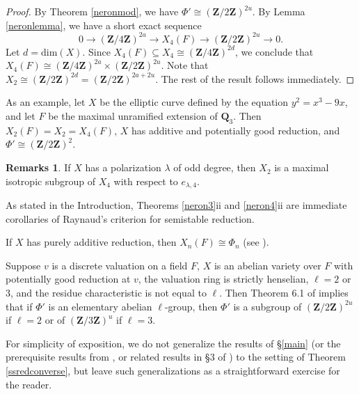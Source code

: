 \documentclass{amsart}
\def\Q{{\mathbf Q}}
\def\Z{{\mathbf Z}}
\def\dim{\mathrm{dim}}
\theoremstyle{definition}
\newtheorem{rems}[thm]{Remarks}
\begin{document}
\begin{proof}
By Theorem \ref{neronmod},
we have $\Phi' \cong (\Z/2\Z)^{2u}$. By Lemma \ref{neronlemma}, 
we have a short exact sequence 
$$0 \to  (\Z/4\Z)^{2a} \to X_4(F) \to (\Z/2\Z)^{2u} \to 0.$$
Let $d = \dim(X)$. 
Since $X_4(F) \subseteq X_4 \cong (\Z/4\Z)^{2d}$,
we conclude that $X_4(F) \cong (\Z/4\Z)^{2a} \times (\Z/2\Z)^{2u}$. 
Note that $X_2 \cong (\Z/2\Z)^{2d} = (\Z/2\Z)^{2a + 2u}$. 
The rest of the result follows immediately.
\end{proof}

As an example, let $X$ be the elliptic curve defined by
the equation $y^2 = x^3 - 9x$, and let $F$ be the maximal unramified
extension of $\Q_3$.
Then $X_2(F) = X_2 = X_4(F)$, $X$ has additive and potentially
good reduction, and $\Phi' \cong (\Z/2\Z)^{2}$.

\begin{rems}
If $X$ has a polarization $\lambda$ of odd degree, then $X_2$ is 
a maximal isotropic subgroup of $X_4$ with respect to $e_{\lambda,4}$.

As stated in the Introduction, 
Theorems \ref{neron3}ii and \ref{neron4}ii are immediate
corollaries of Raynaud's criterion for semistable reduction. 

If $X$ has purely additive reduction, then $X_n(F) \cong
\Phi_n$ (see \cite{Lorenzini}).

Suppose $v$ is a discrete valuation on a field $F$,  
$X$ is an abelian variety over $F$ with potentially good reduction at $v$, 
the valuation ring is strictly henselian, $\ell = 2$ or $3$, and
the residue characteristic is not equal to $\ell$.
Then Theorem 6.1
of \cite{Edixhoven} implies that if $\Phi'$ is an elementary abelian
$\ell$-group,
then $\Phi'$ is a subgroup of $(\Z/2\Z)^{2u}$ if $\ell = 2$ or of 
$(\Z/3\Z)^{u}$ if $\ell = 3$.

For simplicity of exposition, we do not generalize the results of
\S \ref{main} (or the prerequisite results from \cite{semistab}, or
related results in \S 3 of \cite{connected})
to the setting of Theorem \ref{ssredconverse}, but leave such
generalizations as a straightforward exercise for the reader.
\end{rems}
\end{document}
